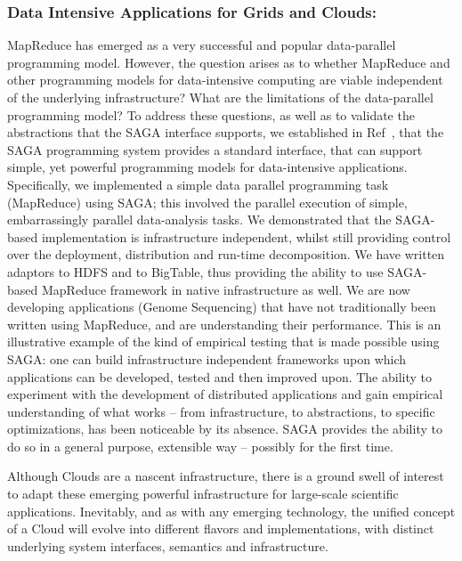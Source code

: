 \documentclass[10pt,letterpaper]{article}
\begin{document}
\subsubsection*{Data Intensive Applications for Grids and Clouds:}
MapReduce has emerged as a very successful and popular data-parallel
programming model. However, the question arises as to whether
MapReduce and other programming models for data-intensive computing
are viable independent of the underlying infrastructure?  What are the
limitations of the data-parallel programming model? To address these
questions, as well as to validate the abstractions that the SAGA
interface supports, we established in Ref~\cite{saga_ccgrid09}, that
the SAGA programming system provides a standard interface, that can
support simple, yet powerful programming models for data-intensive
applications.  Specifically, we implemented a simple data parallel
programming task (MapReduce) using SAGA; this involved the parallel
execution of simple, embarrassingly parallel data-analysis tasks.  We
demonstrated that the SAGA-based implementation is infrastructure
independent, whilst still providing control over the deployment,
distribution and run-time decomposition. We have written adaptors to
HDFS and to BigTable, thus providing the ability to use SAGA-based
MapReduce framework in native infrastructure as well.  We are now
developing applications (Genome Sequencing) that have not
traditionally been written using MapReduce, and are understanding
their performance.  This is an illustrative example of the kind of
empirical testing that is made possible using SAGA: one can build
infrastructure independent frameworks upon which applications can be
developed, tested and then improved upon. The ability to experiment
with the development of distributed applications and gain empirical
understanding of what works -- from infrastructure, to abstractions,
to specific optimizations, has been noticeable by its absence. SAGA
provides the ability to do so in a general purpose, extensible way --
possibly for the first time.

Although Clouds are a nascent infrastructure, there is a ground swell
of interest to adapt these emerging powerful infrastructure for
large-scale scientific applications. Inevitably, and as with any
emerging technology, the unified concept of a Cloud will evolve into
different flavors and implementations, with distinct underlying system
interfaces, semantics and infrastructure. 

\end{document}
